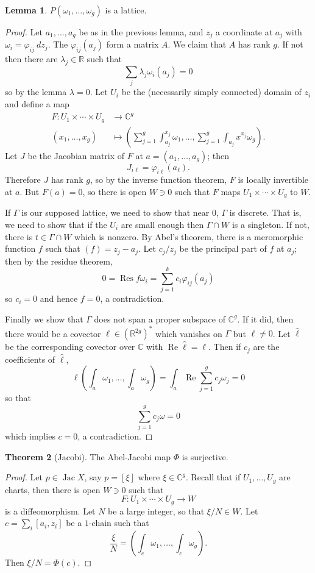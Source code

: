 \documentclass[12pt]{book}
\newcommand{\RR}{\mathbb{R}}
\newcommand{\CC}{\mathbb{C}}
\DeclareMathOperator{\Jac}{Jac}
\DeclareMathOperator{\Res}{Res}
\renewcommand{\Re}{\operatorname{Re}}
\theoremstyle{definition}
\newtheorem{theorem}{Theorem}[chapter]
\newtheorem{lemma}[theorem]{Lemma}
\begin{document}
\begin{lemma}
$P(\omega_1, \dots, \omega_g)$ is a lattice.
\end{lemma}
\begin{proof}
Let $a_1, \dots, a_g$ be as in the previous lemma, and $z_j$ a coordinate at $a_j$ with $\omega_i = \varphi_{ij} ~dz_j$.
The $\varphi_{ij}(a_j)$ form a matrix $A$. We claim that $A$ has rank $g$.
If not then there are $\lambda_j \in \RR$ such that
$$\sum_j \lambda_j \omega_i(a_j) = 0$$
so by the lemma $\lambda = 0$.
Let $U_i$ be the (necessarily simply connected) domain of $z_i$ and define a map
\begin{align*}
F: U_1 \times \cdots \times U_g &\to \CC^g\\
(x_1, \dots, x_g) &\mapsto \left(\sum_{j=1}^g \int_{a_j}^{x_j} \omega_1, \dots, \sum_{j=1}^g \int_{a_j}x^{x_j} \omega_g\right).
\end{align*}
Let $J$ be the Jacobian matrix of $F$ at $a = (a_1, \dots, a_g)$; then
$$J_{i\ell} = \varphi_{i\ell}(a_\ell).$$
Therefore $J$ has rank $g$, so by the inverse function theorem, $F$ is locally invertible at $a$.
But $F(a) = 0$, so there is open $W \ni 0$ such that $F$ maps $U_1 \times \cdots \times U_g$ to $W$.

If $\Gamma$ is our supposed lattice, we need to show that near $0$, $\Gamma$ is discrete.
That is, we need to show that if the $U_i$ are small enough then $\Gamma \cap W$ is a singleton.
If not, there is $t \in \Gamma \cap W$ which is nonzero.
By Abel's theorem, there is a meromorphic function $f$ such that $(f) = z_j - a_j$.
Let $c_j/z_j$ be the principal part of $f$ at $a_j$; then by the residue theorem,
$$0 = \Res f\omega_i = \sum_{j=1}^k c_i \varphi_{ij}(a_j)$$
so $c_i = 0$ and hence $f = 0$, a contradiction.

Finally we show that $\Gamma$ does not span a proper subspace of $\CC^g$.
If it did, then there would be a covector $\ell \in (\RR^{2g})^*$ which vanishes on $\Gamma$ but $\ell \neq 0$.
Let $\hat \ell$ be the corresponding covector over $\CC$ with $\Re \hat \ell = \ell$.
Then if $c_j$ are the coefficients of $\hat \ell$,
$$\ell\left(\int_a \omega_1, \dots, \int_a \omega_g\right) = \int_a \Re \sum_{j=1}^g c_j \omega_j = 0$$
so that
$$\sum_{j=1}^g c_j \omega = 0$$
which implies $c = 0$, a contradiction.
\end{proof}

\begin{theorem}[Jacobi]
The Abel-Jacobi map $\Phi$ is surjective.
\end{theorem}
\begin{proof}
Let $p \in \Jac X$, say $p = [\xi]$ where $\xi \in \CC^g$.
Recall that if $U_1, \dots, U_g$ are charts, then there is open $W \ni 0$ such that
$$F: U_1 \times \cdots \times U_g \to W$$
is a diffeomorphism.
Let $N$ be a large integer, so that $\xi/N \in W$.
Let $c = \sum_i [a_i, z_i]$ be a $1$-chain such that
$$\frac{\xi}{N} = \left(\int_c \omega_1, \dots, \int_c \omega_g\right).$$
Then $\xi/N = \Phi(c)$.
\end{proof}
\end{document}
